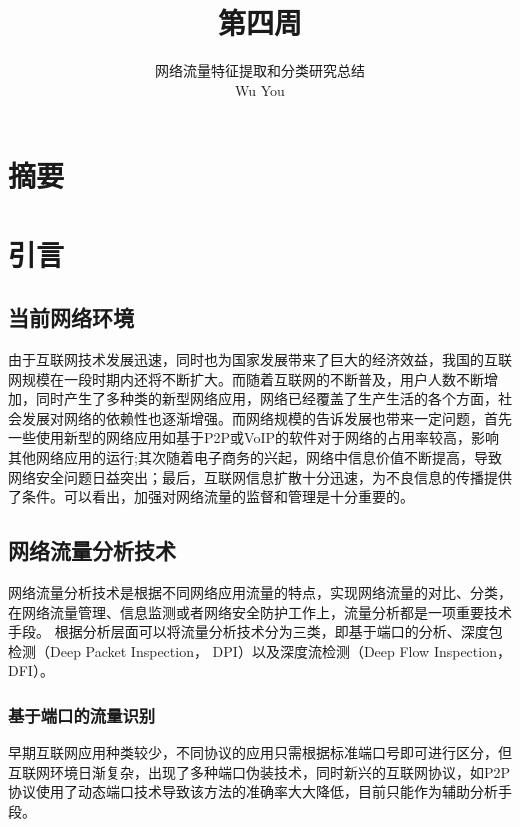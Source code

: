 \documentclass[a4papper]{article}
\title{}
\title{第四周}
\author{网络流量特征提取和分类研究总结\\
Wu You\\ 
}
\begin{document}
\maketitle
\section*{摘要}
\thispagestyle{empty}%
\newpage
\tableofcontents
\thispagestyle{empty}%
\newpage
\setcounter{page}{1}%
\setcounter{section}{0}%

\section{引言}

\subsection{当前网络环境}
\par\setlength{\parindent}{2em} %
由于互联网技术发展迅速，同时也为国家发展带来了巨大的经济效益，我国的互联网规模在一段时期内还将不断扩大。而随着互联网的不断普及，用户人数不断增加，同时产生了多种类的新型网络应用，网络已经覆盖了生产生活的各个方面，社会发展对网络的依赖性也逐渐增强。而网络规模的告诉发展也带来一定问题，首先一些使用新型的网络应用如基于P2P或VoIP的软件对于网络的占用率较高，影响其他网络应用的运行;其次随着电子商务的兴起，网络中信息价值不断提高，导致网络安全问题日益突出；最后，互联网信息扩散十分迅速，为不良信息的传播提供了条件。\cite{林冠洲2011网络流量识别关键技术研究}可以看出，加强对网络流量的监督和管理是十分重要的。
\subsection{网络流量分析技术}
\par\setlength{\parindent}{2em} %
网络流量分析技术是根据不同网络应用流量的特点，实现网络流量的对比、分类，在网络流量管理、信息监测或者网络安全防护工作上，流量分析都是一项重要技术手段。
根据分析层面可以将流量分析技术分为三类，即基于端口的分析、深度包检测（Deep Packet Inspection， DPI）以及深度流检测（Deep Flow Inspection， DFI）。
\subsubsection{基于端口的流量识别}
\par\setlength{\parindent}{2em} %
早期互联网应用种类较少，不同协议的应用只需根据标准端口号即可进行区分，但互联网环境日渐复杂，出现了多种端口伪装技术，同时新兴的互联网协议，如P2P协议使用了动态端口技术导致该方法的准确率大大降低，目前只能作为辅助分析手段。\cite{柏骏2013实时网络流量分类研究综述}
\end{document}
